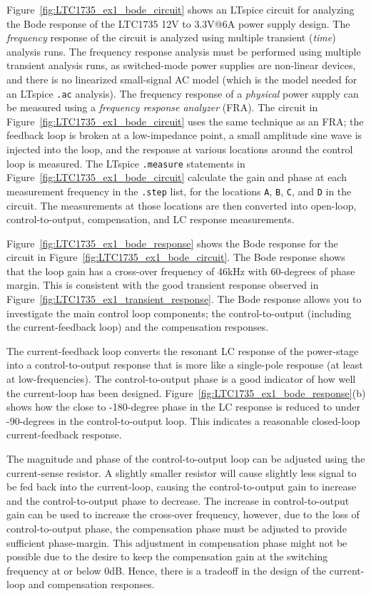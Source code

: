 Figure~\ref{fig:LTC1735_ex1_bode_circuit} shows an LTspice
circuit for analyzing the Bode response of the
LTC1735 12V to 3.3V@6A power supply design. The {\em frequency}
response of the circuit is analyzed using multiple transient
({\em time}) analysis runs. The frequency response analysis
must be performed using multiple transient analysis runs, as
switched-mode power supplies are non-linear devices, and 
there is no linearized small-signal AC model (which is the model
needed for an LTspice \verb+.ac+ analysis). The frequency response
of a {\em physical} power supply can be measured using a
{\em frequency response analyzer} (FRA). The circuit in
Figure~\ref{fig:LTC1735_ex1_bode_circuit} uses the same
technique as an FRA; the feedback loop is broken at a 
low-impedance point, a small amplitude sine wave is injected 
into the loop, and the response at various locations around the
control loop is measured. The LTspice \verb+.measure+ statements in 
Figure~\ref{fig:LTC1735_ex1_bode_circuit} calculate the
gain and phase at each measurement frequency in the \verb+.step+
list, for the locations \verb+A+, \verb+B+, \verb+C+, and \verb+D+
in the circuit. The measurements at those locations are then 
converted into open-loop, control-to-output, compensation, and
LC response measurements.

Figure~\ref{fig:LTC1735_ex1_bode_response} shows the Bode response
for the circuit in Figure~\ref{fig:LTC1735_ex1_bode_circuit}.
The Bode response shows that the loop gain has a
cross-over frequency of 46kHz with 60-degrees of phase margin.
This is consistent with the good transient response observed in
Figure~\ref{fig:LTC1735_ex1_transient_response}. The Bode response
allows you to investigate the main control loop components;
the control-to-output (including the current-feedback loop) 
and the compensation responses.

The current-feedback loop converts the resonant LC response of 
the power-stage into a control-to-output response that is more
like a single-pole response (at least at low-frequencies). 
The control-to-output phase is a good indicator of how well the 
current-loop has been designed.
%
Figure~\ref{fig:LTC1735_ex1_bode_response}(b) shows how the close to
-180-degree phase in the LC response is reduced to under -90-degrees
in the control-to-output loop. This indicates a reasonable 
closed-loop current-feedback response.

The magnitude and phase of the control-to-output loop can be adjusted
using the current-sense resistor. A slightly smaller resistor will
cause slightly less signal to be fed back into the current-loop,
causing the control-to-output gain to increase and the control-to-output
phase to decrease. The increase in control-to-output gain can be
used to increase the cross-over frequency, however, due to the loss
of control-to-output phase, the compensation phase must be adjusted
to provide sufficient phase-margin. This adjustment in compensation
phase might not be possible due to the desire to keep the compensation
gain at the switching frequency at or below 0dB. Hence, there is a
tradeoff in the design of the current-loop and compensation
responses.

